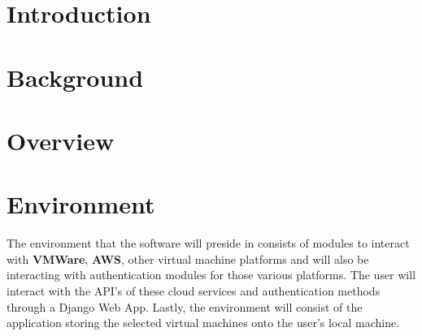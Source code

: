 \documentclass{article}
\title{}
\author{}
\date{}
\begin{document}
    

    \tableofcontents
    \listoffigures

    \newpage
    \begin{versionhistory}
    \end{versionhistory}
    \newpage

    \section{Introduction}

		
    \section{Background}

    \section{Overview}

    \section{Environment}
    The environment that the software will preside in consists of modules to interact with \textbf{VMWare}, 
    \textbf{AWS}, other virtual machine platforms and will also be interacting with authentication modules for those
    various platforms. The user will interact with the API's of these cloud services and authentication
    methods through a Django Web App. Lastly, the environment will consist of the application storing the selected
    virtual machines onto the user's local machine.
\end{document}
